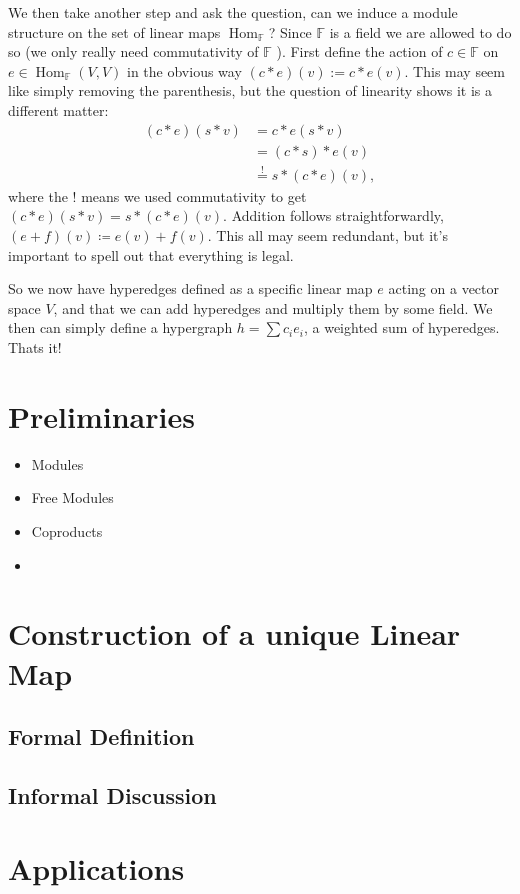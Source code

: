 \documentclass{article}
\newcommand{\field}{\mathbb{F}}
\DeclareMathOperator{\Hom}{Hom}
\begin{document}
We then take another step and ask the question, can we induce a module structure on the set of linear maps $\Hom_{\field}$? Since $\field$ is a field we are allowed to do so (we only really need commutativity of $\field$ ). First define the action of $c \in \field$ on $e \in \Hom_\field(V, V)$ in the obvious way $(c * e) (v) := c * e(v)$. This may seem like simply removing the parenthesis, but the question of linearity shows it is a different matter:
\begin{align}
    (c * e) (s * v) &= c * e( s * v) \\
    &= (c * s) * e(v) \\
    &\overset{!}{=} s * (c * e) (v),
\end{align}
where the ! means we used commutativity to get $(c *e) (s * v) = s * (c * e) (v)$. Addition follows straightforwardly, $(e+f) (v) \coloneqq e(v) + f(v)$. This all may seem redundant, but it's important to spell out that everything is legal.

So we now have hyperedges defined as a specific linear map $e$ acting on a vector space $V$, and that we can add hyperedges and multiply them by some field. We then can simply define a hypergraph $h = \sum c_i e_i$, a weighted sum of hyperedges. Thats it! 


\section{Preliminaries}
\begin{itemize}
    \item Modules
    \item Free Modules
    \item Coproducts
    \item 
\end{itemize}
\section{Construction of a unique Linear Map}
\subsection{Formal Definition}
\subsection{Informal Discussion}

\section{Applications}
\end{document}
